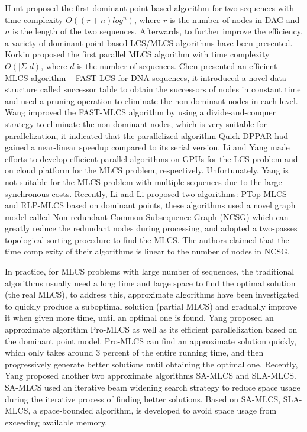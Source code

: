 \documentclass{article}
\begin{document}
Hunt \cite{Hunt1977} proposed the first dominant point based algorithm
for two sequences with time complexity $O((r+n)log^n)$, where $r$ is
the number of nodes in DAG and $n$ is the length of the two
sequences. Afterwards, to further improve the efficiency, a variety of
dominant point based LCS/MLCS algorithms have been presented. Korkin
\cite{Korkin2001} proposed the first parallel MLCS algorithm with time
complexity $O(|\Sigma|d)$, where $d$ is the number of sequences. Chen
\cite{Chen2006} presented an efficient MLCS algorithm -- FAST-LCS for
DNA sequences, it introduced a novel data structure called successor
table to obtain the successors of nodes in constant time and used a
pruning operation to eliminate the non-dominant nodes in each
level. Wang \cite{Wang2011} improved the FAST-MLCS algorithm by using
a divide-and-conquer strategy to eliminate the non-dominant nodes,
which is very suitable for parallelization, it indicated that the
parallelized algorithm Quick-DPPAR had gained a near-linear speedup
compared to its serial version. Li \cite{Li2012} and Yang
\cite{Yang2010} made efforts to develop efficient parallel algorithms
on GPUs for the LCS problem and on cloud platform for the MLCS
problem, respectively. Unfortunately, Yang \cite{Yang2010} is not
suitable for the MLCS problem with multiple sequences due to the large
synchronous costs. Recently, Li \cite{LiICDE} and Li \cite{LiSIGKDD}
proposed two algorithms: PTop-MLCS and RLP-MLCS based on dominant
points, these algorithms used a novel graph model called Non-redundant
Common Subsequence Graph (NCSG) which can greatly reduce the redundant
nodes during processing, and adopted a two-passes topological sorting
procedure to find the MLCS. The authors claimed that the time
complexity of their algorithms is linear to the number of nodes in
NCSG.

In practice, for MLCS problems with large number of sequences, the
traditional algorithms usually need a long time and large space to
find the optimal solution (the real MLCS), to address this,
approximate algorithms have been investigated to quickly produce a
suboptimal solution (partial MLCS) and gradually improve it when given
more time, until an optimal one is found. Yang \cite{Yang2013}
proposed an approximate algorithm Pro-MLCS as well as its efficient
parallelization based on the dominant point model. Pro-MLCS can find
an approximate solution quickly, which only takes around 3 percent of
the entire running time, and then progressively generate better
solutions until obtaining the optimal one. Recently, Yang
\cite{Yang2014} proposed another two approximate algorithms SA-MLCS
and SLA-MLCS. SA-MLCS used an iterative beam widening search strategy
to reduce space usage during the iterative process of finding better
solutions. Based on SA-MLCS, SLA-MLCS, a space-bounded algorithm, is
developed to avoid space usage from exceeding available memory.
\end{document}
